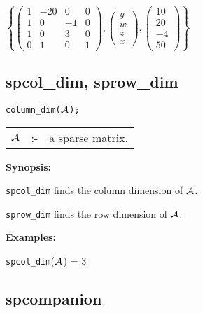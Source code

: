 \vspace*{0.1in}

\begin{flushleft}
\hspace*{0.175in}
\begin{math}  
\left\{ \left( \begin{array}{cccc} 1 & -20 & 0 & 0 \\ 1 & 0 & -1 & 0 \\
 1 & 0 & 3 & 0 \\ 0 & 1 & 0 & 1 
\end{array} \right), \left( \begin{array}{c} y \\ w \\ z \\ x \end{array} 
\right), \left( \begin{array}{c} 10 \\ 20 \\ -4 \\ 50
\end{array} \right) \right\} 
\end{math}  
\end{flushleft}

\subsection{spcol\_dim, sprow\_dim}

\hspace*{0.175in} {\tt column\_dim(${\cal A}$);}

\hspace*{0.1in} 
\begin{tabular}{l l l}
${\cal A}$ &:-& a sparse matrix.
\end{tabular}

{\bf Synopsis:} 

\hspace*{0.175in} {\tt spcol\_dim} finds the column dimension of 
                ${\cal A}$. 

\hspace*{0.175in} {\tt sprow\_dim} finds the row dimension of ${\cal A}$.

{\bf Examples:}

\hspace*{0.175in}
{\tt spcol\_dim}(${\cal A}$) = 3

\subsection{spcompanion}


